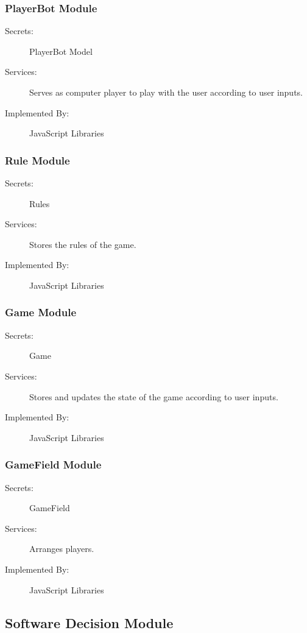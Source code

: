\documentclass[12pt, titlepage]{article}
\begin{document}
\subsubsection{PlayerBot Module}

\begin{description}
\item[Secrets:] PlayerBot Model
\item[Services:] Serves as computer player to play with the user according to user inputs.
\item[Implemented By:] JavaScript Libraries
\end{description}

\subsubsection{Rule Module}

\begin{description}
\item[Secrets:] Rules
\item[Services:] Stores the rules of the game.
\item[Implemented By:] JavaScript Libraries
\end{description}

\subsubsection{Game Module}

\begin{description}
\item[Secrets:] Game
\item[Services:] Stores and updates the state of the game according to user inputs.
\item[Implemented By:] JavaScript Libraries
\end{description}

\subsubsection{GameField Module}

\begin{description}
\item[Secrets:] GameField
\item[Services:] Arranges players.
\item[Implemented By:] JavaScript Libraries
\end{description}

\subsection{Software Decision Module}
\end{document}
